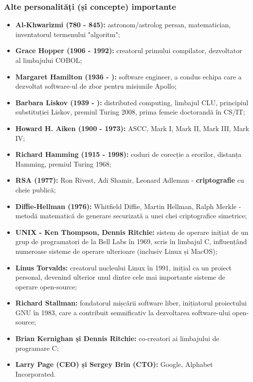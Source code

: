 \documentclass[a4paper,10pt]{article}
\begin{document}
\begin{multicols}{2}
\subsubsection{Alte personalități (și concepte) importante}
\begin{itemize}
    \item \textbf{Al-Khwarizmi (780 - 845):} astronom/astrolog persan, matematician, inventatorul termenului "algoritm";
    \item \textbf{Grace Hopper (1906 - 1992):} creatorul primului compilator, dezvoltator al limbajului COBOL;
    \item \textbf{Margaret Hamilton (1936 - ):} software engineer, a condus echipa care a dezvoltat software-ul de zbor pentru misiunile Apollo;
    \item \textbf{Barbara Liskov (1939 - ):} distributed computing, limbajul CLU, principiul substituției Liskov, premiul Turing 2008, prima femeie doctorandă în CS/IT;
    \item \textbf{Howard H. Aiken (1900 - 1973):} ASCC, Mark I, Mark II, Mark III, Mark IV;
    \item \textbf{Richard Hamming (1915 - 1998):} coduri de corecție a erorilor, distanța Hamming, premiul Turing 1968;
    \item \textbf{RSA (1977):} Ron Rivest, Adi Shamir, Leonard Adleman - \textbf{criptografie} cu cheie publică;
    \item \textbf{Diffie-Hellman (1976):} Whitfield Diffie, Martin Hellman, Ralph Merkle - metodă matematică de generare securizată a unei chei criptografice simetrice;
    \item \textbf{UNIX - Ken Thompson, Dennis Ritchie:} sistem de operare inițiat de un grup de programatori de la Bell Labs în 1969, scris în limbajul C, influențând numeroase sisteme de operare ulterioare (inclusiv Linux și MacOS);
    \item \textbf{Linus Torvalds:} creatorul nucleului Linux în 1991, inițial ca un proiect personal, devenind ulterior unul dintre cele mai importante sisteme de operare open-source;
    \item \textbf{Richard Stallman:} fondatorul mișcării software liber, inițiatorul proiectului GNU în 1983, care a contribuit semnificativ la dezvoltarea software-ului open-source;
    \item \textbf{Brian Kernighan și Dennis Ritchie:} co-creatori ai limbajului de programare C;
    \item \textbf{Larry Page (CEO) și Sergey Brin (CTO):} Google, Alphabet Incorporated.
\end{itemize}
\end{multicols}
\end{document}
